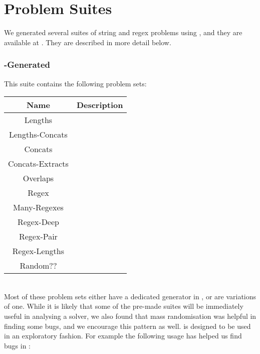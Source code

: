 \section{Problem Suites}

    We generated several suites of string and regex problems using \fuzzer{}, and they are available at \problemRepo{}. They are described in more detail below.

    \subsubsection{\fuzzer{}-Generated}

        This suite contains the following problem sets: \\

        \begin{tabular}{|c|c|}
            \hline
            \textbf{Name}    & \textbf{Description} \\ \hline
            Lengths          & \\ \hline
            Lengths-Concats  & \\ \hline
            Concats          & \\ \hline
            Concats-Extracts & \\ \hline
            Overlaps         & \\ \hline
            Regex            & \\ \hline
            Many-Regexes     & \\ \hline
            Regex-Deep       & \\ \hline
            Regex-Pair       & \\ \hline
            Regex-Lengths    & \\ \hline
            Random??         & \\ \hline
        \end{tabular}

        \hfill \\

        Most of these problem sets either have a dedicated generator in \generator{}, or are variations of one. While it is likely that some of the pre-made suites will be immediately useful in analysing a solver, we also found that mass randomisation was helpful in finding some bugs, and we encourage this pattern as well. \generator{} is designed to be used in an exploratory fashion. For example the following usage has helped us find bugs in \us{}: \\

